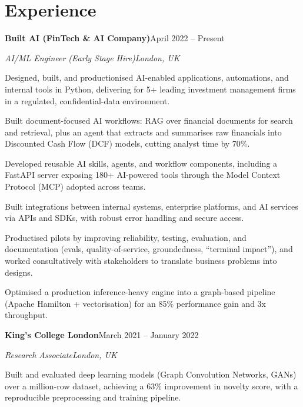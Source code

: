 \documentclass[10pt,a4paper]{article}
\newcommand{\entry}[4]{%
  {\color{company}\bfseries #1}\hfill {\color{muted}#2}\par
  \vspace{1pt}
  {\itshape #3}\hfill {\color{muted}\itshape #4}\par
  \vspace{3pt}%
}
\begin{document}
\section{Experience}
\entry{Built AI (FinTech \& AI Company)}{April 2022 -- Present}{AI/ML Engineer (Early Stage Hire)}{London, UK}
\begin{tight}
  \item Designed, built, and productionised AI-enabled applications, automations, and internal tools in Python, delivering for 5+ leading investment management firms in a regulated, confidential-data environment.
  \item Built document-focused AI workflows: RAG over financial documents for search and retrieval, plus an agent that extracts and summarises raw financials into Discounted Cash Flow (DCF) models, cutting analyst time by 70\%.
  \item Developed reusable AI skills, agents, and workflow components, including a FastAPI server exposing 180+ AI-powered tools through the Model Context Protocol (MCP) adopted across teams.
  \item Built integrations between internal systems, enterprise platforms, and AI services via APIs and SDKs, with robust error handling and secure access.
  \item Productised pilots by improving reliability, testing, evaluation, and documentation (evals, quality-of-service, groundedness, ``terminal impact''), and worked consultatively with stakeholders to translate business problems into designs.
  \item Optimised a production inference-heavy engine into a graph-based pipeline (Apache Hamilton + vectorisation) for an 85\% performance gain and 3x throughput.
\end{tight}

\entry{King's College London}{March 2021 -- January 2022}{Research Associate}{London, UK}
\begin{tight}
  \item Built and evaluated deep learning models (Graph Convolution Networks, GANs) over a million-row dataset, achieving a 63\% improvement in novelty score, with a reproducible preprocessing and training pipeline.
\end{tight}

\end{document}
